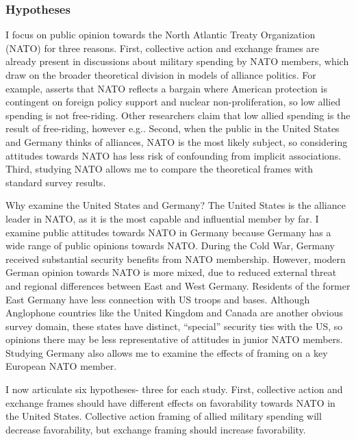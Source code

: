 \documentclass[12pt]{article}
\begin{document}
\subsubsection{Hypotheses}


I focus on public opinion towards the North Atlantic Treaty Organization (NATO) for three reasons. 
First, collective action and exchange frames are already present in discussions about military spending by NATO members, which draw on the broader theoretical division in models of alliance politics.
For example, \citet{Lanoszka2015} asserts that NATO reflects a bargain where American protection is contingent on foreign policy support and nuclear non-proliferation, so low allied spending is not free-riding. 
Other researchers claim that low allied spending is the result of free-riding, however e.g.\citep{OlsonZeckhauser1966, PluemperNeumayer2015, KimSandler2019}.
Second, when the public in the United States and Germany thinks of alliances, NATO is the most likely subject, so considering attitudes towards NATO has less risk of confounding from implicit associations. 
Third, studying NATO allows me to compare the theoretical frames with standard survey results.


Why examine the United States and Germany? 
The United States is the alliance leader in NATO, as it is the most capable and influential member by far. 
I examine public attitudes towards NATO in Germany because Germany has a wide range of public opinions towards NATO. 
During the Cold War, Germany received substantial security benefits from NATO membership. 
However, modern German opinion towards NATO is more mixed, due to reduced external threat and regional differences between East and West Germany.
Residents of the former East Germany have less connection with US troops and bases. 
Although Anglophone countries like the United Kingdom and Canada are another obvious survey domain, these states have distinct, ``special'' security ties with the US, so opinions there may be less representative of attitudes in junior NATO members. 
Studying Germany also allows me to examine the effects of framing on a key European NATO member. 


I now articulate six hypotheses- three for each study. 
First, collective action and exchange frames should have different effects on favorability towards NATO in the United States. 
Collective action framing of allied military spending will decrease favorability, but exchange framing should increase favorability. 
\end{document}
